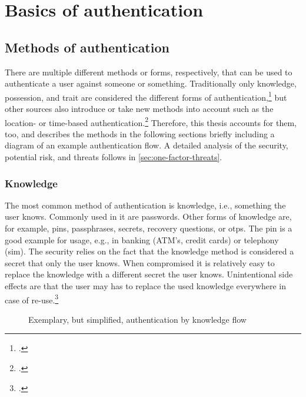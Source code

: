 \chapter{Basics of authentication}
\label{chapter:basics}

\section{Methods of authentication}
There are multiple different methods or forms, respectively, that can be used to authenticate a user against someone or something. Traditionally only knowledge, possession, and trait are considered the different forms of authentication,\footcites[See][299]{10.2307/27845364}[See][140]{brotherston2017defensive}[][47]{anderson2008security} but other sources also introduce or take new methods into account such as the location- or time-based authentication.\footcites[][]{6296127}[See][191]{dasgupta2017multi} Therefore, this thesis accounts for them, too, and describes the methods in the following sections briefly including a diagram of an example authentication flow. A detailed analysis of the security, potential risk, and threats follows in \autoref{sec:one-factor-threats}.

\subsection{Knowledge}

The most common method of authentication is knowledge, i.e., \frqq something the user knows\flqq{}. Commonly used in \gls{it} are passwords. Other forms of knowledge are, for example, \glspl{pin}, passphrases, secrets, recovery questions, or \glspl{otp}. The \gls{pin} is a good example for usage, e.g., in banking (ATM's, credit cards) or telephony (\gls{sim}). The security relies on the fact that the knowledge method is considered a secret that only the user knows. When compromised it is relatively easy to replace the knowledge with a different secret the user knows. Unintentional side effects are that the user may has to replace the used knowledge everywhere in case of re-use.\footcite[See][467]{eckert-it-sec-9}

\newpage

\begin{figure}[hbt]
	\centering
	
	\caption[Exemplary, but simplified, authentication by knowledge flow]{Exemplary, but simplified, authentication by knowledge flow\footnotemark}
	\label{fig:knowledge_auth_flow}
\end{figure}


